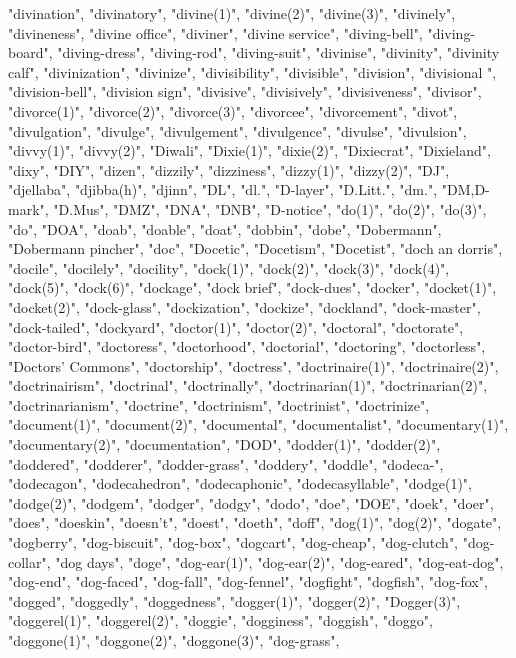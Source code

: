 "divination",
"divinatory",
"divine(1)",
"divine(2)",
"divine(3)",
"divinely",
"divineness",
"divine office",
"diviner",
"divine service",
"diving-bell",
"diving-board",
"diving-dress",
"diving-rod",
"diving-suit",
"divinise",
"divinity",
"divinity calf",
"divinization",
"divinize",
"divisibility",
"divisible",
"division",
"divisional ",
"division-bell",
"division sign",
"divisive",
"divisively",
"divisiveness",
"divisor",
"divorce(1)",
"divorce(2)",
"divorce(3)",
"divorcee",
"divorcement",
"divot",
"divulgation",
"divulge",
"divulgement",
"divulgence",
"divulse",
"divulsion",
"divvy(1)",
"divvy(2)",
"Diwali",
"Dixie(1)",
"dixie(2)",
"Dixiecrat",
"Dixieland",
"dixy",
"DIY",
"dizen",
"dizzily",
"dizziness",
"dizzy(1)",
"dizzy(2)",
"DJ",
"djellaba",
"djibba(h)",
"djinn",
"DL",
"dl.",
"D-layer",
"D.Litt.",
"dm.",
"DM,D-mark",
"D.Mus",
"DMZ",
"DNA",
"DNB",
"D-notice",
"do(1)",
"do(2)",
"do(3)",
"do",
"DOA",
"doab",
"doable",
"doat",
"dobbin",
"dobe",
"Dobermann",
"Dobermann pincher",
"doc",
"Docetic",
"Docetism",
"Docetist",
"doch an dorris",
"docile",
"docilely",
"docility",
"dock(1)",
"dock(2)",
"dock(3)",
"dock(4)",
"dock(5)",
"dock(6)",
"dockage",
"dock brief",
"dock-dues",
"docker",
"docket(1)",
"docket(2)",
"dock-glass",
"dockization",
"dockize",
"dockland",
"dock-master",
"dock-tailed",
"dockyard",
"doctor(1)",
"doctor(2)",
"doctoral",
"doctorate",
"doctor-bird",
"doctoress",
"doctorhood",
"doctorial",
"doctoring",
"doctorless",
"Doctors' Commons",
"doctorship",
"doctress",
"doctrinaire(1)",
"doctrinaire(2)",
"doctrinairism",
"doctrinal",
"doctrinally",
"doctrinarian(1)",
"doctrinarian(2)",
"doctrinarianism",
"doctrine",
"doctrinism",
"doctrinist",
"doctrinize",
"document(1)",
"document(2)",
"documental",
"documentalist",
"documentary(1)",
"documentary(2)",
"documentation",
"DOD",
"dodder(1)",
"dodder(2)",
"doddered",
"dodderer",
"dodder-grass",
"doddery",
"doddle",
"dodeca-",
"dodecagon",
"dodecahedron",
"dodecaphonic",
"dodecasyllable",
"dodge(1)",
"dodge(2)",
"dodgem",
"dodger",
"dodgy",
"dodo",
"doe",
"DOE",
"doek",
"doer",
"does",
"doeskin",
"doesn't",
"doest",
"doeth",
"doff",
"dog(1)",
"dog(2)",
"dogate",
"dogberry",
"dog-biscuit",
"dog-box",
"dogcart",
"dog-cheap",
"dog-clutch",
"dog-collar",
"dog days",
"doge",
"dog-ear(1)",
"dog-ear(2)",
"dog-eared",
"dog-eat-dog",
"dog-end",
"dog-faced",
"dog-fall",
"dog-fennel",
"dogfight",
"dogfish",
"dog-fox",
"dogged",
"doggedly",
"doggedness",
"dogger(1)",
"dogger(2)",
"Dogger(3)",
"doggerel(1)",
"doggerel(2)",
"doggie",
"dogginess",
"doggish",
"doggo",
"doggone(1)",
"doggone(2)",
"doggone(3)",
"dog-grass",
